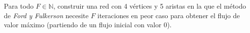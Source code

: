 
\item Para todo $F \in \mathbb{N}$, construir una red con 4 vértices y 5 aristas en la que el método de {\em Ford y Fulkerson} necesite $F$ iteraciones en peor caso para obtener el flujo de valor máximo (partiendo de un flujo inicial con valor $0$).


